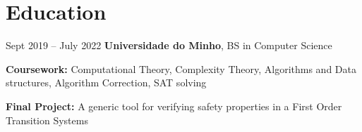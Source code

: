 \documentclass[10pt, letterpaper]{article}
\begin{document}
    \newcommand{\AND}{\unskip
        \cleaders\copy\ANDbox\hskip\wd\ANDbox
        \ignorespaces
    }
    \newsavebox\ANDbox
    \sbox\ANDbox{$|$}


    \vspace{5 pt - 0.3 cm}

    \section{Education}



        
        \begin{twocolentry}{
            Sept 2019 – July 2022
        }
            \textbf{Universidade do Minho}, BS in Computer Science\end{twocolentry}

        \vspace{0.10 cm}
        \begin{onecolentry}
            \begin{highlights}
                \item \textbf{Coursework:} Computational Theory, Complexity Theory, Algorithms and Data structures, Algorithm Correction, SAT solving
                \item \textbf{Final Project:} A generic tool for verifying safety properties in a First Order Transition Systems
            \end{highlights}
        \end{onecolentry}

        \vspace{0.2cm}
\end{document}
